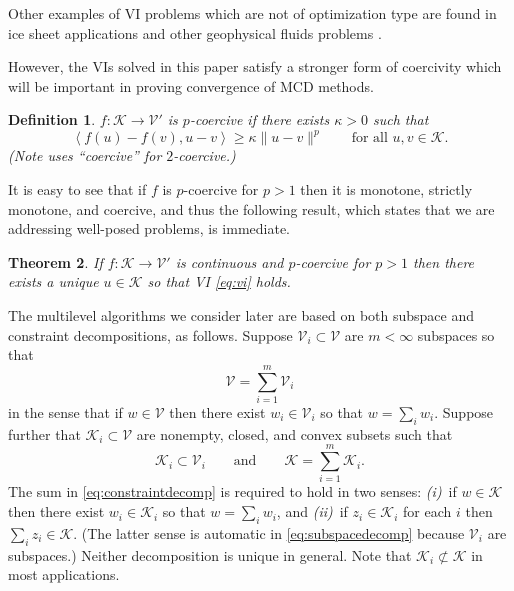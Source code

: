 \documentclass[letterpaper,final,12pt,reqno]{amsart}
\theoremstyle{cstyle}
\newtheorem{theorem}{Theorem}
\theoremstyle{dstyle}
\newtheorem{definition}[theorem]{Definition}
\numberwithin{equation}{section}
\numberwithin{figure}{section}
\numberwithin{table}{section}
\numberwithin{theorem}{section}
\newcommand{\cK}{\mathcal{K}}
\newcommand{\cV}{\mathcal{V}}
\newcommand{\ip}[2]{\left<#1,#2\right>}
\begin{document}
Other examples of VI problems which are not of optimization type are found in ice sheet applications \cite{Calvoetal2002,JouvetBueler2012} and other geophysical fluids problems \cite{Bueler2021conservation}.

However, the VIs solved in this paper satisfy a stronger form of coercivity which will be important in proving convergence of MCD methods.

\begin{definition}  $f:\cK \to \cV'$ is \emph{$p$-coercive} if there exists $\kappa>0$ such that
\begin{equation}
\ip{f(u)-f(v)}{u-v} \ge \kappa \|u-v\|^p \qquad \text{for all } u,v \in \cK. \label{eq:pcoercive}
\end{equation}
(Note \cite{Tai2003} uses ``coercive'' for $2$-coercive.)
\end{definition}

It is easy to see that if $f$ is $p$-coercive for $p>1$ then it is monotone, strictly monotone, and coercive, and thus the following result, which states that we are addressing well-posed problems, is immediate.

\begin{theorem}  \label{thm:viwellposed}  If $f:\cK \to \cV'$ is continuous and $p$-coercive for $p>1$ then there exists a unique $u\in \cK$ so that VI \eqref{eq:vi} holds.
\end{theorem}

The multilevel algorithms we consider later are based on both subspace \cite{Xu1992} and constraint \cite{Tai2003} decompositions, as follows.  Suppose $\cV_i \subset \cV$ are $m<\infty$ subspaces so that
\begin{equation}
\cV = \sum_{i=1}^m \cV_i \label{eq:subspacedecomp}
\end{equation}
in the sense that if $w \in \cV$ then there exist $w_i \in \cV_i$ so that $w = \sum_i w_i$.  Suppose further that $\cK_i \subset \cV$ are nonempty, closed, and convex subsets such that
\begin{equation}
\cK_i \subset \cV_i \qquad \text{and} \qquad \cK = \sum_{i=1}^m \cK_i. \label{eq:constraintdecomp}
\end{equation}
The sum in \eqref{eq:constraintdecomp} is required to hold in two senses: \emph{(i)}~if $w \in \cK$ then there exist $w_i \in \cK_i$ so that $w = \sum_i w_i$, and \emph{(ii)}~if $z_i \in \cK_i$ for each $i$ then $\sum_i z_i \in \cK$.  (The latter sense is automatic in \eqref{eq:subspacedecomp} because $\cV_i$ are subspaces.)  Neither decomposition is unique in general.  Note that $\cK_i \not\subset \cK$ in most applications.
\end{document}
